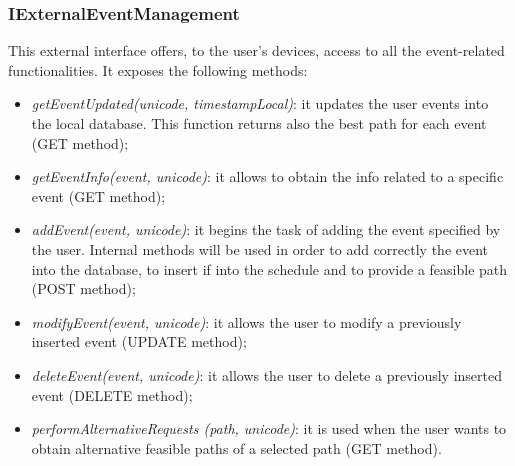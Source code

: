 \subsubsection{IExternalEventManagement}
This external interface offers, to the user's devices, access to all the event-related functionalities. It exposes the following methods:
\begin{itemize}
\item \textit{getEventUpdated(unicode, timestampLocal)}: it updates the user events into the local database. This function returns also the best path for each event (GET method);
\item \textit{getEventInfo(event, unicode)}: it allows to obtain the info related to a specific event (GET method);
\item \textit{addEvent(event, unicode)}: it begins the task of adding the event specified by the user. Internal methods will be used in order to add correctly the event into the database, to insert if into the schedule and to provide a feasible path (POST method);
\item \textit{modifyEvent(event, unicode)}: it allows the user to modify a previously inserted event (UPDATE method);
\item \textit{deleteEvent(event, unicode)}: it allows the user to delete a previously inserted event (DELETE method);
\item \textit{performAlternativeRequests (path, unicode)}: it is used when the user wants to obtain alternative feasible paths of a selected path (GET method).
\end{itemize}

